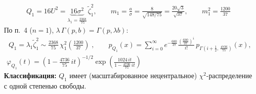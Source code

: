 \documentclass[12pt]{spbstu-task}
\begin{document}
\begin{gather*}
  Q_1 = 16U^2 = \underbrace{16\sigma^2}_{\lambda_1 = \frac{2368}{75}}\,\tilde{\zeta}_1^2,\qquad
  m_1 = \frac{a}{\sigma} = \frac{8}{\sqrt{148/75}} = \frac{20\sqrt{3}}{\sqrt{37}},\qquad
  m_1^2 = \frac{1200}{37}
\end{gather*}
По п.~4 (\(n = 1\)), \(\lambda\,\Gamma(p, b) = \Gamma(p, \lambda b)\):
\begin{gather*}
  \boxed{\;Q_1 = \lambda_1\tilde{\zeta}_1^2 \sim \frac{2368}{75}\,\chi_1^2\!\left(\frac{1200}{37}\right)\;},\qquad
  p_{Q_1}(x) = \sum_{i=0}^\infty e^{-\frac{600}{37}}\frac{\left(\frac{600}{37}\right)^i}{i!}\,p_{\Gamma\left(i + \frac{1}{2},\,\frac{4736}{75}\right)}(x), \\
  \varphi_{Q_1}(t) = \left(1 - \frac{4736}{75}\,it\right)^{-1/2}\exp\left(\frac{1024\,it}{1 - \frac{4736}{75}\,it}\right)
\end{gather*}
\textbf{Классификация:} \(Q_1\) имеет (масштабированное нецентральное) \(\chi^2\)-распределение с одной степенью свободы.
\end{document}
